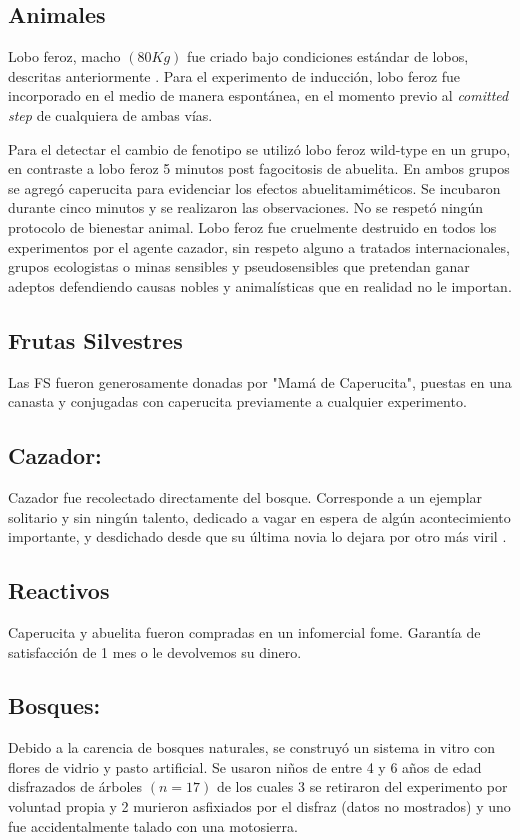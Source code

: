 \documentclass[fleqn,10pt]{AmateCodex} %
\begin{document}
\subsection{Animales}
Lobo feroz, macho $(80 Kg)$ fue criado bajo condiciones estándar de lobos, descritas anteriormente \cite{Herret}
. Para el experimento de inducción, lobo feroz fue incorporado en el medio de manera espontánea, en el momento previo al \textit{comitted step} de cualquiera de ambas vías.

Para el detectar el cambio de fenotipo se utilizó lobo feroz wild-type en un grupo, en contraste a lobo
feroz 5 minutos post fagocitosis de abuelita. En ambos grupos se agregó caperucita para evidenciar
los efectos abuelitamiméticos. Se incubaron durante cinco minutos y se realizaron las observaciones.
No se respetó ningún protocolo de bienestar animal.
Lobo feroz fue cruelmente destruido en todos los experimentos por el agente cazador, sin respeto
alguno a tratados internacionales, grupos ecologistas o minas sensibles y pseudosensibles que pretendan
ganar adeptos defendiendo causas nobles y animalísticas que en realidad no le importan.


\subsection{Frutas Silvestres}
Las FS fueron generosamente donadas por "Mamá de Caperucita", puestas en una canasta y conjugadas
con caperucita previamente a cualquier experimento.

\subsection{Cazador:}
Cazador fue recolectado directamente del bosque.
Corresponde a un ejemplar solitario y sin ningún talento, dedicado a vagar en espera de algún acontecimiento importante, y desdichado desde que su última novia lo dejara por otro más viril \cite{Ependorf}.

\subsection{Reactivos}
Caperucita y abuelita fueron compradas en un infomercial fome. Garantía de satisfacción de 1 mes o le devolvemos su dinero.

\subsection{Bosques:}
Debido a la carencia de bosques naturales, se construyó un sistema in vitro con flores de vidrio y pasto artificial. Se usaron niños de entre 4 y 6 años de edad disfrazados de árboles $(n = 17)$ de los cuales 3 se retiraron del experimento por voluntad propia y 2 murieron asfixiados por el disfraz (datos no mostrados) y uno fue accidentalmente talado con
una motosierra.
\end{document}
